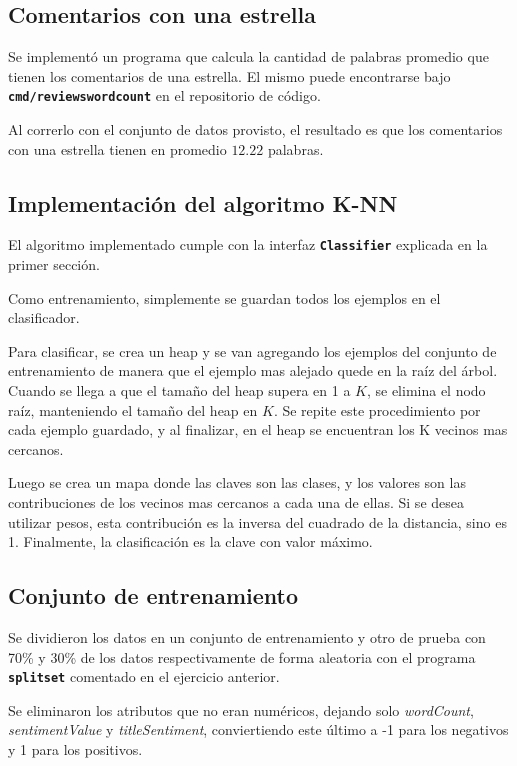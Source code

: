 \documentclass[a4paper]{article}
\newcommand{\bold}[1]{\textbf{\texttt{#1}}}
\begin{document}
\subsection{Comentarios con una estrella}
Se implementó un programa que calcula la cantidad de palabras promedio que tienen los comentarios de una estrella. El mismo puede encontrarse bajo \bold{cmd/reviewswordcount} en el repositorio de código.

Al correrlo con el conjunto de datos provisto, el resultado es que los comentarios con una estrella tienen en promedio $12.22$ palabras.

\subsection{Implementación del algoritmo K-NN}
El algoritmo implementado cumple con la interfaz \bold{Classifier} explicada en la primer sección.

Como entrenamiento, simplemente se guardan todos los ejemplos en el clasificador.

Para clasificar, se crea un heap y se van agregando los ejemplos del conjunto de entrenamiento de manera que el ejemplo mas alejado quede en la raíz del árbol. Cuando se llega a que el tamaño del heap supera en 1 a $K$, se elimina el nodo raíz, manteniendo el tamaño del heap en $K$. Se repite este procedimiento por cada ejemplo guardado, y al finalizar, en el heap se encuentran los K vecinos mas cercanos.

Luego se crea un mapa donde las claves son las clases, y los valores son las contribuciones de los vecinos mas cercanos a cada una de ellas. Si se desea utilizar pesos, esta contribución es la inversa del cuadrado de la distancia, sino es 1. Finalmente, la clasificación es la clave con valor máximo.

\newpage

\subsection{Conjunto de entrenamiento}
Se dividieron los datos en un conjunto de entrenamiento y otro de prueba con 70\% y 30\% de los datos respectivamente de forma aleatoria con el programa \bold{splitset} comentado en el ejercicio anterior.

Se eliminaron los atributos que no eran numéricos, dejando solo \textit{wordCount}, \textit{sentimentValue} y \textit{titleSentiment}, conviertiendo este último a -1 para los negativos y 1 para los positivos.
\end{document}
